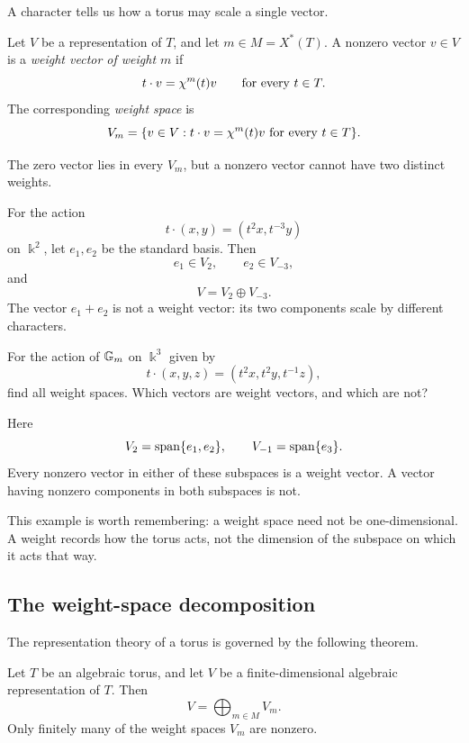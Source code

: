 A character tells us how a torus may scale a single vector.

\begin{definition}
Let \(V\) be a representation of \(T\), and let \(m\in M=X^*(T)\).
A nonzero vector \(v\in V\) is a \emph{weight vector of weight \(m\)}
if
\[
t\cdot v=\chi^{m}(t)v
\qquad
\text{for every }t\in T.
\]
The corresponding \emph{weight space} is
\[
V_m
=
\{v\in V:t\cdot v=\chi^{m}(t)v
\text{ for every }t\in T\}.
\]
\end{definition}

The zero vector lies in every \(V_m\), but a nonzero vector cannot
have two distinct weights.

\begin{example}
For the action
\[
t\cdot(x,y)=(t^2x,t^{-3}y)
\]
on \(\Bbbk^2\), let \(e_1,e_2\) be the standard basis. Then
\[
e_1\in V_2,
\qquad
e_2\in V_{-3},
\]
and
\[
V=V_2\oplus V_{-3}.
\]
The vector \(e_1+e_2\) is not a weight vector: its two components scale
by different characters.
\end{example}

\begin{pauseandthink}
For the action of \(\mathbb{G}_{m}\) on \(\Bbbk^3\) given by
\[
t\cdot(x,y,z)=(t^2x,t^2y,t^{-1}z),
\]
find all weight spaces. Which vectors are weight vectors, and which
are not?
\end{pauseandthink}

Here
\[
V_2=\operatorname{span}\{e_1,e_2\},
\qquad
V_{-1}=\operatorname{span}\{e_3\}.
\]
Every nonzero vector in either of these subspaces is a weight vector.
A vector having nonzero components in both subspaces is not.

This example is worth remembering: a weight space need not be
one-dimensional. A weight records how the torus acts, not the
dimension of the subspace on which it acts that way.

\subsection{The weight-space decomposition}

The representation theory of a torus is governed by the following
theorem.

\begin{theorem}
\label{thm:torus-weight-decomposition}
Let \(T\) be an algebraic torus, and let \(V\) be a finite-dimensional
algebraic representation of \(T\). Then
\[
V
=
\bigoplus_{m\in M}V_m.
\]
Only finitely many of the weight spaces \(V_m\) are nonzero.
\end{theorem}

